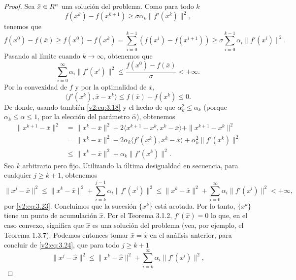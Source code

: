 \begin{proof}
    Sea $\bar{x} \in R^n$ una solución del problema. Como para todo $k$
    \[
        f(x^k) - f(x^{k+1}) \ge \sigma \alpha_k \|f'(x^k)\|^2,
    \]
    tenemos que
    \[
        f(x^0) - f(\bar{x}) \ge f(x^0) - f(x^k) = \sum_{i=0}^{k-1} (f(x^i) - f(x^{i+1})) \ge \sigma \sum_{i=0}^{k-1} \alpha_i \|f'(x^i)\|^2.
    \]
    Pasando al límite cuando $k \to \infty$, obtenemos que
    \begin{equation}
        \sum_{i=0}^{\infty} \alpha_i \|f'(x^i)\|^2 \le \frac{f(x^0) - f(\bar{x})}{\sigma} < +\infty.
        \label{v2:eq:3.23}
    \end{equation}
    Por la convexidad de $f$ y por la optimalidad de $\bar{x}$,
    \[
        \langle f'(x^k), \bar{x} - x^k \rangle \le f(\bar{x}) - f(x^k) \le 0.
    \]
    De donde, usando también \eqref{v2:eq:3.18} y el hecho de que $\alpha_k^2 \le \alpha_k$ (porque $\alpha_k \le \hat{\alpha} \le 1$, por la elección del parámetro $\hat{\alpha}$), obtenemos
    \begin{align*}
        \|x^{k+1} - \bar{x}\|^2 &= \|x^k - \bar{x}\|^2 + 2\langle x^{k+1} - x^k, x^k - \bar{x} \rangle + \|x^{k+1} - x^k\|^2 \\
        &= \|x^k - \bar{x}\|^2 - 2\alpha_k \langle f'(x^k), x^k - \bar{x} \rangle + \alpha_k^2 \|f'(x^k)\|^2 \\
        &\le \|x^k - \bar{x}\|^2 + \alpha_k \|f'(x^k)\|^2.
    \end{align*}
    Sea $k$ arbitrario pero fijo. Utilizando la última desigualdad en secuencia, para cualquier $j \ge k+1$, obtenemos
    \begin{equation}
        \|x^j - \bar{x}\|^2 \le \|x^k - \bar{x}\|^2 + \sum_{i=k}^{j-1} \alpha_i \|f'(x^i)\|^2 \le \|x^k - \bar{x}\|^2 + \sum_{i=0}^\infty \alpha_i \|f'(x^i)\|^2 < +\infty,
        \label{v2:eq:3.24}
    \end{equation}
    por \eqref{v2:eq:3.23}. Concluimos que la sucesión $\{x^k\}$ está acotada. Por lo tanto, $\{x^k\}$ tiene un punto de acumulación $\hat{x}$. Por el Teorema 3.1.2, $f'(\hat{x}) = 0$ lo que, en el caso convexo, significa que $\hat{x}$ es una solución del problema (vea, por ejemplo, el Teorema 1.3.7). Podemos entonces tomar $\bar{x} = \hat{x}$ en el análisis anterior, para concluir de \eqref{v2:eq:3.24}, que para todo $j \ge k+1$
    \begin{equation}
        \|x^j - \hat{x}\|^2 \le \|x^k - \hat{x}\|^2 + \sum_{i=k}^\infty \alpha_i \|f'(x^i)\|^2,
        \label{v2:eq:3.25}
    \end{equation}

\end{proof}
